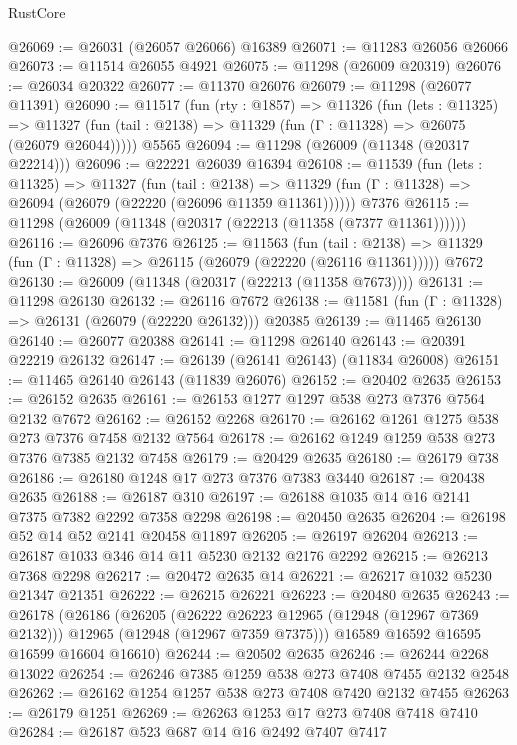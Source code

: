 \begin{lexlean}{RustCore}
\begin{coremodule}
@26069 := @26031 (@26057 @26066) @16389
@26071 := @11283 @26056 @26066
@26073 := @11514 @26055 @4921
@26075 := @11298 (@26009 @20319)
@26076 := @26034 @20322
@26077 := @11370 @26076
@26079 := @11298 (@26077 @11391)
@26090 := @11517
    (fun (rty : @1857) =>
    @11326
      (fun (lets : @11325) =>
      @11327 (fun (tail : @2138) => @11329 (fun (Γ : @11328) => @26075 (@26079 @26044)))))
    @5565
@26094 := @11298 (@26009 (@11348 (@20317 @22214)))
@26096 := @22221 @26039 @16394
@26108 := @11539
    (fun (lets : @11325) =>
    @11327
      (fun (tail : @2138) =>
      @11329 (fun (Γ : @11328) => @26094 (@26079 (@22220 (@26096 @11359 @11361))))))
    @7376
@26115 := @11298 (@26009 (@11348 (@20317 (@22213 (@11358 (@7377 @11361))))))
@26116 := @26096 @7376
@26125 := @11563
    (fun (tail : @2138) => @11329 (fun (Γ : @11328) => @26115 (@26079 (@22220 (@26116 @11361)))))
    @7672
@26130 := @26009 (@11348 (@20317 (@22213 (@11358 @7673))))
@26131 := @11298 @26130
@26132 := @26116 @7672
@26138 := @11581 (fun (Γ : @11328) => @26131 (@26079 (@22220 @26132))) @20385
@26139 := @11465 @26130
@26140 := @26077 @20388
@26141 := @11298 @26140
@26143 := @20391 @22219 @26132
@26147 := @26139 (@26141 @26143) (@11834 @26008)
@26151 := @11465 @26140 @26143 (@11839 @26076)
@26152 := @20402 @2635
@26153 := @26152 @2635
@26161 := @26153 @1277 @1297 @538 @273 @7376 @7564 @2132 @7672
@26162 := @26152 @2268
@26170 := @26162 @1261 @1275 @538 @273 @7376 @7458 @2132 @7564
@26178 := @26162 @1249 @1259 @538 @273 @7376 @7385 @2132 @7458
@26179 := @20429 @2635
@26180 := @26179 @738
@26186 := @26180 @1248 @17 @273 @7376 @7383 @3440
@26187 := @20438 @2635
@26188 := @26187 @310
@26197 := @26188 @1035 @14 @16 @2141 @7375 @7382 @2292 @7358 @2298
@26198 := @20450 @2635
@26204 := @26198 @52 @14 @52 @2141 @20458 @11897
@26205 := @26197 @26204
@26213 := @26187 @1033 @346 @14 @11 @5230 @2132 @2176 @2292
@26215 := @26213 @7368 @2298
@26217 := @20472 @2635 @14
@26221 := @26217 @1032 @5230 @21347 @21351
@26222 := @26215 @26221
@26223 := @20480 @2635
@26243 := @26178
    (@26186
      (@26205
        (@26222 @26223 @12965 (@12948 (@12967 @7369 @2132)))
        @12965
        (@12948 (@12967 @7359 @7375)))
      @16589
      @16592
      @16595
      @16599
      @16604
      @16610)
@26244 := @20502 @2635
@26246 := @26244 @2268 @13022
@26254 := @26246 @7385 @1259 @538 @273 @7408 @7455 @2132 @2548
@26262 := @26162 @1254 @1257 @538 @273 @7408 @7420 @2132 @7455
@26263 := @26179 @1251
@26269 := @26263 @1253 @17 @273 @7408 @7418 @7410
@26284 := @26187
    @523
    @687
    @14
    @16
    @2492
    @7407
    @7417

\end{coremodule}
\end{lexlean}
